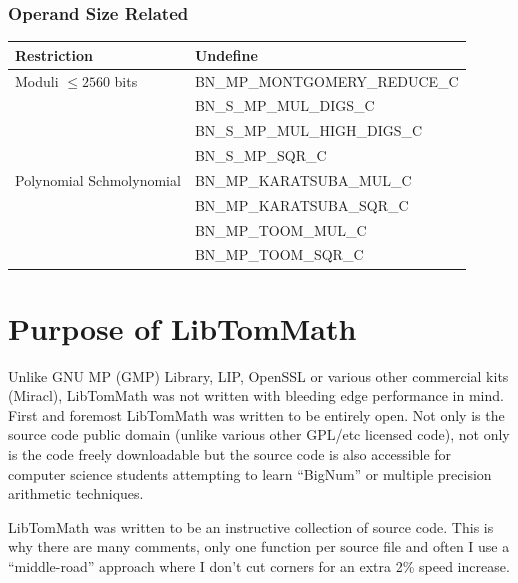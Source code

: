 \documentclass[synpaper]{book}
\begin{document}
\subsubsection{Operand Size Related}
\begin{small}
\begin{center}
\begin{tabular}{|l|l|}
\hline \textbf{Restriction} & \textbf{Undefine} \\
\hline Moduli $\le 2560$ bits              & BN\_MP\_MONTGOMERY\_REDUCE\_C \\
                                           & BN\_S\_MP\_MUL\_DIGS\_C \\
                                           & BN\_S\_MP\_MUL\_HIGH\_DIGS\_C \\
                                           & BN\_S\_MP\_SQR\_C \\
\hline Polynomial Schmolynomial            & BN\_MP\_KARATSUBA\_MUL\_C \\
                                           & BN\_MP\_KARATSUBA\_SQR\_C \\
                                           & BN\_MP\_TOOM\_MUL\_C \\
                                           & BN\_MP\_TOOM\_SQR\_C \\

\hline
\end{tabular}
\end{center}
\end{small}

\section{Purpose of LibTomMath}
Unlike  GNU MP (GMP) Library, LIP, OpenSSL or various other commercial kits (Miracl), LibTomMath was not written with
bleeding edge performance in mind.  First and foremost LibTomMath was written to be entirely open.  Not only is the
source code public domain (unlike various other GPL/etc licensed code), not only is the code freely downloadable but the
source code is also accessible for computer science students attempting to learn ``BigNum'' or multiple precision
arithmetic techniques.

LibTomMath was written to be an instructive collection of source code.  This is why there are many comments, only one
function per source file and often I use a ``middle-road'' approach where I don't cut corners for an extra 2\% speed
increase.
\end{document}
